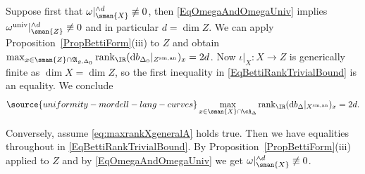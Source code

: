 Suppose first that $\omega|_{\sman{X}}^{\wedge d}\not\equiv 0$, then
\eqref{EqOmegaAndOmegaUniv} implies
$\omega^{\mathrm{univ}}|_{\sman{Z}}^{\wedge d}\not\equiv 0$ and in
particular $d=\dim Z$.
We can apply
Proposition~\ref{PropBettiForm}(iii)  to $Z$ and obtain
$ \max_{x \in \sman{Z} \cap \mathfrak{A}_{g,\Delta_0}} \mathrm{rank}_{\IR}
(\mathrm{d}b_{\Delta_0}|_{Z^{\mathrm{sm,an}}})_x =2d$.
Now $\iota|_X\colon X\rightarrow Z$ is
generically finite as $\dim X = \dim Z$,
so the first inequality in \eqref{EqBettiRankTrivialBound} is an
equality. We conclude
\begin{equation}
\label{eq:maxrankXgeneralA}
\source{uniformity-mordell-lang-curves}
\max_{x \in \sman{X} \cap \cA_\Delta} \mathrm{rank}_{\IR}
(\mathrm{d}b_{\Delta}|_{X^{\mathrm{sm,an}}})_x =2d.
\end{equation}


Conversely, assume \eqref{eq:maxrankXgeneralA} holds true.
Then we have equalities throughout in \eqref{EqBettiRankTrivialBound}.
By Proposition~\ref{PropBettiForm}(iii) applied to $Z$ and
by \eqref{EqOmegaAndOmegaUniv} we get $\omega|_{\sman{X}}^{\wedge
d}\not\equiv 0$.







